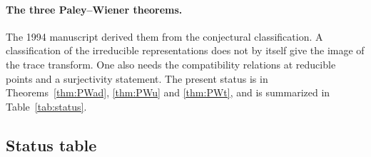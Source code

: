 \documentclass[12pt,letterpaper]{article}
\numberwithin{equation}{section}
\theoremstyle{definition}
\begin{document}
\paragraph{The three Paley--Wiener theorems.}  The 1994 manuscript derived them from the
conjectural classification.  A classification of the irreducible representations does
not by itself give the image of the trace transform.  One also needs the compatibility
relations at reducible points and a surjectivity statement.  The present status is in
Theorems~\ref{thm:PWad}, \ref{thm:PWu} and \ref{thm:PWt}, and is summarized in
Table~\ref{tab:status}.

\subsection{Status table}
\end{document}
